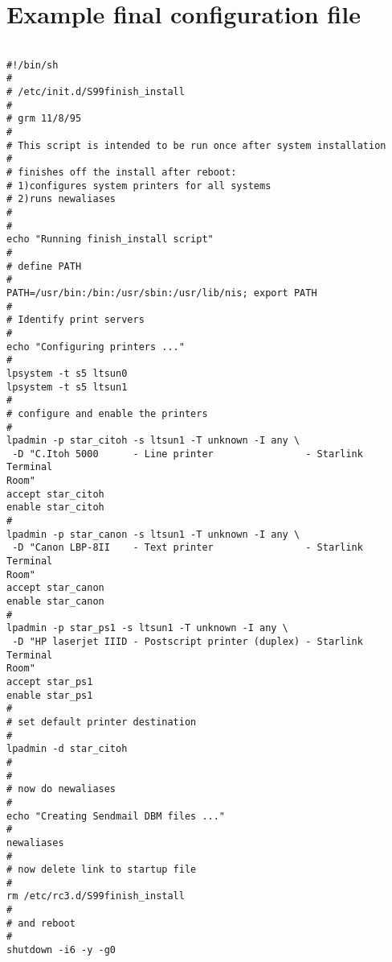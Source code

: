 \documentclass[11pt]{article}
\begin{document}
\newpage

\section{Example final configuration file}
\label{app:config}

\begin{small}
\begin{verbatim}

#!/bin/sh
#
# /etc/init.d/S99finish_install
#
# grm 11/8/95
#
# This script is intended to be run once after system installation
#
# finishes off the install after reboot:
# 1)configures system printers for all systems
# 2)runs newaliases
#
#
echo "Running finish_install script"
#
# define PATH
#
PATH=/usr/bin:/bin:/usr/sbin:/usr/lib/nis; export PATH
#
# Identify print servers
#
echo "Configuring printers ..."
#
lpsystem -t s5 ltsun0
lpsystem -t s5 ltsun1
#
# configure and enable the printers
#
lpadmin -p star_citoh -s ltsun1 -T unknown -I any \
 -D "C.Itoh 5000      - Line printer                - Starlink Terminal
Room"
accept star_citoh
enable star_citoh
#
lpadmin -p star_canon -s ltsun1 -T unknown -I any \
 -D "Canon LBP-8II    - Text printer                - Starlink Terminal
Room"
accept star_canon
enable star_canon
#
lpadmin -p star_ps1 -s ltsun1 -T unknown -I any \
 -D "HP laserjet IIID - Postscript printer (duplex) - Starlink Terminal
Room"
accept star_ps1
enable star_ps1
#
# set default printer destination
#
lpadmin -d star_citoh
#
#
# now do newaliases
#
echo "Creating Sendmail DBM files ..."
#
newaliases
#
# now delete link to startup file
#
rm /etc/rc3.d/S99finish_install
#
# and reboot
#
shutdown -i6 -y -g0

\end{verbatim}
\end{small}
\end{document}
